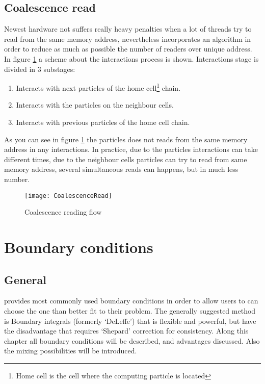 \subsection{Coalescence read}
%
Newest hardware not suffers really heavy penalties when a lot of threads try to read from the same memory address,
nevertheless \NAME incorporates an algorithm in order to reduce as much as possible the number of readers over
unique address. In figure \ref{fig:aquagpusph:CoalescenceRead} a scheme about the interactions process is shown.
Interactions stage is divided in 3 substages:
%
\begin{enumerate}
	\item Interacts with next particles of the home cell\footnote{Home cell is the cell where the computing
	particle is located} chain.
	\item Interacts with the particles on the neighbour cells.
	\item Interacts with previous particles of the home cell chain.
\end{enumerate}
%
As you can see in figure \ref{fig:aquagpusph:CoalescenceRead} the particles does not reads from the same memory
address in any interactions. In practice, due to the particles interactions can take different times, due to the
neighbour cells particles can try to read from same memory address, several simultaneous reads can happens, but
in much less number.
%
\begin{figure}[ht!]
  \centering
  \texttt{[image: CoalescenceRead]}
  \caption{Coalescence reading flow}
  \label{fig:aquagpusph:CoalescenceRead}
\end{figure}
%
\section{Boundary conditions}
\label{ss:aquagpusph:boundaries}
%
\subsection{General}
%
\NAME provides most commonly used boundary conditions in order to allow users to can choose the one than better fit
to their problem. The generally suggested method is Boundary integrals (formerly `DeLeffe') that is flexible and
powerful, but have the disadvantage that requires `Shepard' correction for consistency.\rc
%
Along this chapter all boundary conditions will be described, and advantages discussed. Also the mixing possibilities
will be introduced.
%




%
